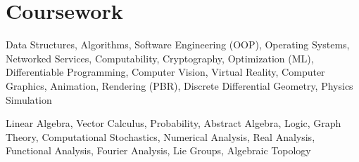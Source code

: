 \documentclass[letterpaper,11pt]{article}
\begin{document}
\section{Coursework}
    \small{\begin{description}[leftmargin=0.5in, itemindent=-0.25in, labelindent=0.5in, itemsep=-0.2em]
        \item[CSE] Data Structures, Algorithms, Software Engineering (OOP), Operating Systems, Networked Services, Computability, Cryptography, Optimization (ML), Differentiable Programming, Computer Vision, Virtual Reality, Computer Graphics, Animation, Rendering (PBR), Discrete Differential Geometry, Physics Simulation \\[1em]

        \item[MATH] Linear Algebra, Vector Calculus, Probability, Abstract Algebra, Logic, Graph Theory, Computational Stochastics, Numerical Analysis, Real Analysis, Functional Analysis, Fourier Analysis, Lie Groups, Algebraic Topology \\[-10em]
    \end{description}}

\end{document}
